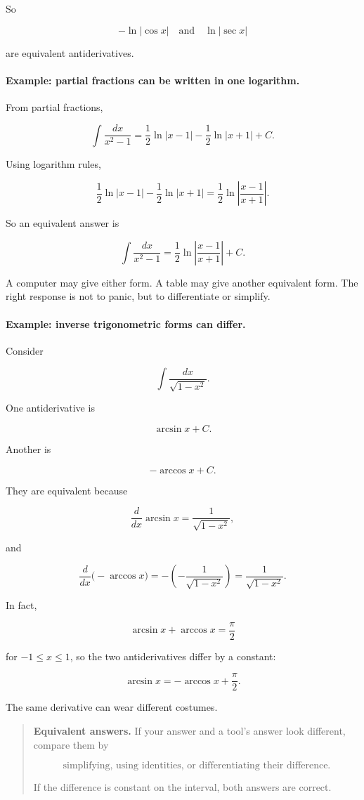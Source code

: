 So

\[
\boxed{
-\ln|\cos x|
\quad\text{and}\quad
\ln|\sec x|
}
\]

are equivalent antiderivatives.

\paragraph{Example: partial fractions can be written in one logarithm.}
From partial fractions,

\[
\int \frac{dx}{x^2-1}
=
\frac12\ln|x-1|-\frac12\ln|x+1|+C.
\]

Using logarithm rules,

\[
\frac12\ln|x-1|-\frac12\ln|x+1|
=
\frac12\ln\left|\frac{x-1}{x+1}\right|.
\]

So an equivalent answer is

\[
\boxed{
\int \frac{dx}{x^2-1}
=
\frac12\ln\left|\frac{x-1}{x+1}\right|+C.
}
\]

A computer may give either form.  A table may give another equivalent form.  The
right response is not to panic, but to differentiate or simplify.

\paragraph{Example: inverse trigonometric forms can differ.}
Consider

\[
\int \frac{dx}{\sqrt{1-x^2}}.
\]

One antiderivative is

\[
\arcsin x+C.
\]

Another is

\[
-\arccos x+C.
\]

They are equivalent because

\[
\frac{d}{dx}\arcsin x=\frac1{\sqrt{1-x^2}},
\]

and

\[
\frac{d}{dx}\bigl(-\arccos x\bigr)
=
-\left(-\frac1{\sqrt{1-x^2}}\right)
=
\frac1{\sqrt{1-x^2}}.
\]

In fact,

\[
\arcsin x+\arccos x=\frac{\pi}{2}
\]

for \(-1\le x\le1\), so the two antiderivatives differ by a constant:

\[
\arcsin x
=
-\arccos x+\frac{\pi}{2}.
\]

The same derivative can wear different costumes.

\begin{quote}
\textbf{Equivalent answers.}
If your answer and a tool's answer look different, compare them by

\[
\text{simplifying, using identities, or differentiating their difference.}
\]

If the difference is constant on the interval, both answers are correct.
\end{quote}

